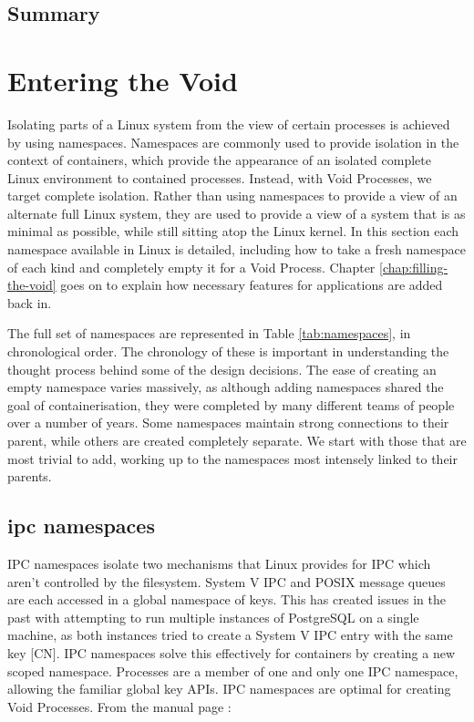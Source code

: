 \documentclass[a4paper,12pt,twoside,openright]{report}
\begin{document}
\section{Summary}


\chapter{Entering the Void}
\label{chap:entering-the-void}

Isolating parts of a Linux system from the view of certain processes is achieved by using namespaces. Namespaces are commonly used to provide isolation in the context of containers, which provide the appearance of an isolated complete Linux environment to contained processes. Instead, with Void Processes, we target complete isolation. Rather than using namespaces to provide a view of an alternate full Linux system, they are used to provide a view of a system that is as minimal as possible, while still sitting atop the Linux kernel. In this section each namespace available in Linux is detailed, including how to take a fresh namespace of each kind and completely empty it for a Void Process. Chapter \ref{chap:filling-the-void} goes on to explain how necessary features for applications are added back in.

The full set of namespaces are represented in Table \ref{tab:namespaces}, in chronological order. The chronology of these is important in understanding the thought process behind some of the design decisions. The ease of creating an empty namespace varies massively, as although adding namespaces shared the goal of containerisation, they were completed by many different teams of people over a number of years. Some namespaces maintain strong connections to their parent, while others are created completely separate. We start with those that are most trivial to add, working up to the namespaces most intensely linked to their parents.

\section{ipc namespaces}
\label{sec:voiding-ipc}

IPC namespaces isolate two mechanisms that Linux provides for IPC which aren't controlled by the filesystem. System V IPC and POSIX message queues are each accessed in a global namespace of keys. This has created issues in the past with attempting to run multiple instances of PostgreSQL on a single machine, as both instances tried to create a System V IPC entry with the same key [CN]. IPC namespaces solve this effectively for containers by creating a new scoped namespace. Processes are a member of one and only one IPC namespace, allowing the familiar global key APIs. IPC namespaces are optimal for creating Void Processes. From the manual page \citep{free_software_foundation_ipc_namespaces7_2021}:
\end{document}
